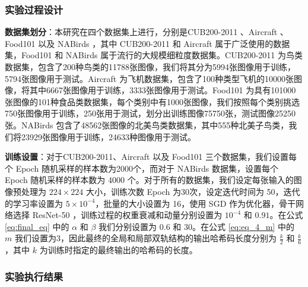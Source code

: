 \subsubsection{实验过程设计}

\textbf{数据集划分}：本研究在四个数据集上进行，分别是CUB200-2011 \cite{Wah2011TheCB}、Aircraft \cite{maji2013finegrained}、Food101 \cite{food101_2014} 以及 NABirds \cite{nabirds2015}，其中 CUB200-2011 和 Aircraft 属于广泛使用的数据集，Food101 和 NABirds 属于流行的大规模细粒度数据集。CUB200-2011 为鸟类数据集，包含了200种鸟类的11788张图像，我们将其分为5994张图像用于训练，5794张图像用于测试。Aircraft 为飞机数据集，包含了100种类型飞机的10000张图像，将其中6667张图像用于训练，3333张图像用于测试。Food101 为具有101000张图像的101种食品类数据集，每个类别中有1000张图像，我们按照每个类别挑选750张图像用于训练，250张用于测试，划分出训练图像75750张，测试图像25250张。NABirds 包含了48562张图像的北美鸟类数据集，其中555种北美子鸟类，我们将23929张图像用于训练，24633种图像用于测试。

\textbf{训练设置}：对于CUB200-2011、Aircraft 以及 Food101 三个数据集，我们设置每个 Epoch 随机采样的样本数为2000个，而对于 NABirds 数据集，设置每个 Epoch 随机采样的样本数为 4000 个。对于所有的数据集，我们设定每张输入的图像预处理为 $224 \times 224$ 大小，训练次数 Epoch 为30次，设定迭代时间为 50，迭代的学习率设置为 $5 \times 10^{-4}$，批量的大小设置为 16，使用 SGD 作为优化器，骨干网络选择 ResNet-50 \cite{he2015deep}，训练过程的权重衰减和动量分别设置为 $10^{-4}$ 和 $0.91$。在公式 \ref{eq:final_eq} 中的 $\alpha$ 和 $\beta$ 我们分别设置为 $0.6$ 和 $30$。在公式 \ref{eq:eq_4_m} 中的 $m$ 我们设置为3，因此最终的全局和局部双轨结构的输出哈希码长度分别为 $\frac{k}{2}$ 和 $\frac{k}{6}$，其中 $k$ 为训练时指定的最终输出的哈希码的长度。



\subsubsection{实验执行结果}


